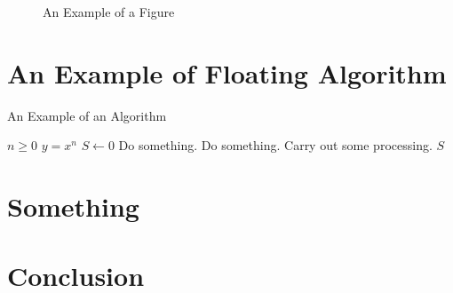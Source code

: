 \documentclass[10pt,conference,a4paper,nofonttune]{IEEEtran}
\begin{document}
\begin{figure}[t]
\begin{minipage}[b]{.3\hsize}
      \label{Fig:Example:C}
   \end{minipage}
   \caption{An Example of a Figure}
   \label{Fig:Example}
\end{figure}

\lipsum[1]

\section{An Example of Floating Algorithm}
\lipsum[5-6]

\begin{algorithm}[t]
   \caption{An Example of an Algorithm}
   \begin{algorithmic}[1]
      \REQUIRE $n\geq0$
      \ENSURE $y=x^n$
      \STATE $S\leftarrow0$
         \STATE Do something.
      \ELSE
         \STATE Do something.
      \ENDIF
         \STATE Carry out some processing.
      \ENDFOR
      \RETURN $S$
   \end{algorithmic}
\end{algorithm}

\lipsum[9-11]

\section{Something}
\lipsum[12-15]

\balance

\section{Conclusion}
\lipsum[4]



\end{document}
